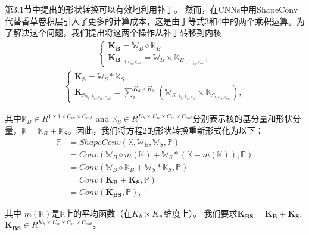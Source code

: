 第3.1节中提出的形状转换可以有效地利用补丁。
然而，在CNNs中用ShapeConv代替香草卷积层引入了更多的计算成本，这是由于等式3和4中的两个乘积运算。为了解决这个问题，我们提出将这两个操作从补丁转移到内核
\begin{equation*}
	\begin{aligned}
		\begin{cases}
			\textbf{K}_\textbf{B} = \mathbb{W}_B \diamond \mathbb{K}_B \\
			\textbf{K}_{\textbf{B}_{1,1,c_{in},c_{out}}} = \mathbb{W}_B \times \mathbb{K}_{B_{1,1,c_{in},c_{out}}},
		\end{cases}
		\label{eq:base-product-K}
	\end{aligned}
\end{equation*}
\begin{equation*}
	\begin{aligned}
		\begin{cases}
			\textbf{K}_\textbf{S} = \mathbb{W}_S \ast \mathbb{K}_S \\
			\textbf{K}_{\textbf{S}_{{k_h},{k_w},{c_{in}},{c_{out}}}} = \sum_{i}^{K_h \times K_w} (\mathbb{W}_{S_{i,{k_h},{k_w},{c_{in}}}} \times \mathbb{K}_{S_{i,{c_{in}},{c_{out}}}}),
		\end{cases}
		\label{eq:shape-product-K}
	\end{aligned}
\end{equation*}

其中$\mathbb{K}_B \in R^{1 \times 1 \times C_{in} \times C_{out}}$ and $\mathbb{K}_S \in R^{K_h \times K_w \times C_{in} \times C_{out}}$分别表示核的基分量和形状分量，$\mathbb{K} = \mathbb{K}_B + \mathbb{K}_S$。因此，我们将方程2的形状转换重新形式化为以下：
\begin{equation}
	\label{eq:shapeconv-kernel}
	\begin{aligned}
		\mathbb{F} &= ShapeConv(\mathbb{K}, \mathbb{W}_B, \mathbb{W}_S, \mathbb{P})\\
		&= Conv(\mathbb{W}_B \diamond m(\mathbb{K})+ \mathbb{W}_S \ast (\mathbb{K} - m(\mathbb{K})), \mathbb{P})\\
		&= Conv(\mathbb{W}_B \diamond \mathbb{K}_B+ \mathbb{W}_S \ast \mathbb{K}_S, \mathbb{P})\\
		&= Conv(\textbf{K}_\textbf{B} + \textbf{K}_\textbf{S}, \mathbb{P})\\
		&= Conv(\textbf{K}_\textbf{BS}, \mathbb{P}),
	\end{aligned}
\end{equation}

其中 $m(\mathbb{K})$是$\mathbb{K}$上的平均函数（在$K_h \times K_w$维度上）。
我们要求$\textbf{K}_\textbf{BS} = \textbf{K}_\textbf{B} + \textbf{K}_\textbf{S}$, $\textbf{K}_\textbf{BS} \in R^{K_h \times K_w \times C_{in} \times C_{out}}$。

